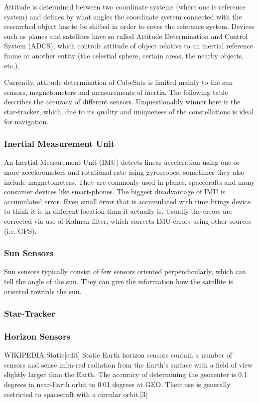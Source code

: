 \documentclass[12pt,a4paper,oneside]{article}
\begin{document}
Attitude is determined between two coordinate systems (where one is reference system) and defines by what angles the coordinate system connected with the researched object has to be shifted in order to cover the reference system.
Devices such as planes and satellites have so called Attitude Determination and Control System (ADCS), which controls attitude of object relative to an inertial reference frame or another entity (the celestial sphere, certain areas, the nearby objects, etc.).

Currently, attitude determination of CubeSats is limited mainly to the sun sensors, magnetometers and measurements of inertia. The following table describes the accuracy of different sensors. Unquestionably winner here is the star-tracker, which, due to its quality and uniqueness of the constellations is ideal for navigation. 

\subsubsection{Inertial Measurement Unit}
An Inertial Measurement Unit (IMU) detects linear acceleration using one or more accelerometers and rotational rate using gyroscopes, sometimes they also include magnetometers. They are commonly used in planes, spacecrafts and many consumer devices like smart-phones. The biggest disadvantage of IMU is accumulated error. Even small error that is accumulated with time brings device to think it is in different location than it actually is. Usually the errors are corrected via use of Kalman filter, which corrects IMU errors using other sources (i.e. GPS).
\subsubsection{Sun Sensors}
Sun sensors typically consist of few sensors oriented perpendicularly, which can tell the angle of the sun. They can give the information how the satellite is oriented towards the sun.
\subsubsection{Star-Tracker}
\subsubsection{Horizon Sensors}
WIKIPEDIA
Static[edit]
Static Earth horizon sensors contain a number of sensors and sense infra-red radiation from the Earth’s surface with a field of view slightly larger than the Earth. The accuracy of determining the geocenter is 0.1 degrees in near-Earth orbit to 0.01 degrees at GEO. Their use is generally restricted to spacecraft with a circular orbit.[3]
\end{document}
